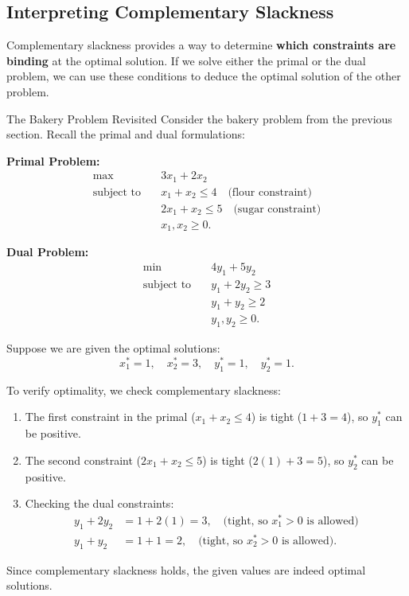 \subsection{Interpreting Complementary Slackness}
Complementary slackness provides a way to determine 	\textbf{which constraints are binding} at the optimal solution. If we solve either the primal or the dual problem, we can use these conditions to deduce the optimal solution of the other problem.

\begin{example}{The Bakery Problem Revisited}{}
Consider the bakery problem from the previous section. Recall the primal and dual formulations:

\textbf{Primal Problem:}
\begin{align*}
\max \quad & 3x_1 + 2x_2 \\
\text{subject to} \quad & x_1 + x_2 \leq 4 \quad \text{(flour constraint)} \\
& 2x_1 + x_2 \leq 5 \quad \text{(sugar constraint)} \\
& x_1, x_2 \geq 0.
\end{align*}

\textbf{Dual Problem:}
\begin{align*}
\min \quad & 4y_1 + 5y_2 \\
\text{subject to} \quad & y_1 + 2y_2 \geq 3 \\
& y_1 + y_2 \geq 2 \\
& y_1, y_2 \geq 0.
\end{align*}

Suppose we are given the optimal solutions:
\[
x_1^* = 1, \quad x_2^* = 3, \quad y_1^* = 1, \quad y_2^* = 1.
\]

To verify optimality, we check complementary slackness:
\begin{enumerate}
\item The first constraint in the primal ($x_1 + x_2 \leq 4$) is tight ($1+3=4$), so $y_1^*$ can be positive.
\item  The second constraint ($2x_1 + x_2 \leq 5$) is tight ($2(1) + 3 = 5$), so $y_2^*$ can be positive.
\item  Checking the dual constraints:
   \begin{align*}
   y_1 + 2y_2 &= 1 + 2(1) = 3, \quad \text{(tight, so $x_1^* > 0$ is allowed)} \\
   y_1 + y_2 &= 1 + 1 = 2, \quad \text{(tight, so $x_2^* > 0$ is allowed)}.
   \end{align*}
\end{enumerate}
Since complementary slackness holds, the given values are indeed optimal solutions.
\end{example}


